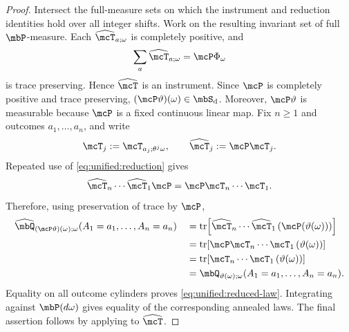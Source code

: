 \documentclass[a4paper]{article}
\numberwithin{equation}{section}   %
\theoremstyle{plain}   %
\theoremstyle{plain}   %
\theoremstyle{examplestyle}
\DeclareMathOperator{\states}{\mbS_d}   %
\DeclareMathOperator{\pr}{\mbP}           %
\begin{document}
    \begin{proof}
        Intersect the full-measure sets on which the instrument and reduction identities hold over all integer shifts. 
        Work on the resulting invariant set of full $\pr$-measure.
        Each $\widehat{\mcT}_{a;\omega}$ is completely positive,
        and
        \[
         \sum_a\widehat{\mcT}_{a;\omega}
         =\mcP\Phi_\omega
        \]
        is trace preserving. Hence $\widehat{\mcT}$ is an instrument.
        Since $\mcP$ is completely positive and trace preserving, $(\mcP\vartheta)(\omega)\in\states$.
        Moreover, $\mcP\vartheta$ is measurable because $\mcP$ is a fixed continuous linear map.
        Fix $n\ge1$ and outcomes $a_1,\ldots,a_n$, and write
        \[
             \mcT_j:=\mcT_{a_j;\theta^j\omega},
             \qquad
             \widehat{\mcT}_j:=\mcP\mcT_j.
        \]
        Repeated use of \eqref{eq:unified:reduction} gives
        \[
             \widehat{\mcT}_n\cdots\widehat{\mcT}_1
             \mcP
             =
             \mcP\mcT_n\cdots\mcT_1.
        \]
        Therefore, using preservation of trace by $\mcP$,
        \begin{align*}
         \widehat{\mbQ}_{(\mcP\vartheta)(\omega);\omega}
           (A_1=a_1,\ldots,A_n=a_n)
         &\quad=
         \operatorname{tr}\!\left[
           \widehat{\mcT}_n\cdots\widehat{\mcT}_1
           \left(\mcP(\vartheta(\omega))\right)
         \right]
         \\
         &\quad=
         \operatorname{tr}\!\left[
           \mcP\mcT_n\cdots\mcT_1
           \left(\vartheta(\omega)\right)
         \right]
         \\
         &\quad=
         \operatorname{tr}\!\left[
           \mcT_n\cdots\mcT_1
           \left(\vartheta(\omega)\right)
         \right]
         \\
         &\quad=
         \mbQ_{\vartheta(\omega);\omega}
           (A_1=a_1,\ldots,A_n=a_n).
        \end{align*}
        Equality on all outcome cylinders proves \eqref{eq:unified:reduced-law}. Integrating against $\pr(d\omega)$ gives equality of the corresponding annealed laws.
        The final assertion follows by applying  to $\widehat{\mcT}$.
    \end{proof}
\end{document}
